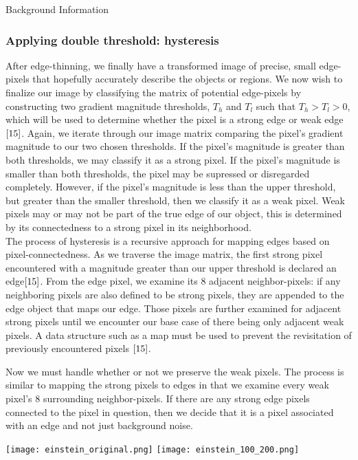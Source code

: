\documentclass[a4paper,12pt]{article}
\begin{document}
\begin{section}{Background Information}
\subsubsection{Applying double threshold: hysteresis}

After edge-thinning, we finally have a transformed image of precise, small edge-pixels that hopefully accurately describe the objects or regions.
We now wish to finalize our image by classifying the matrix of potential edge-pixels by constructing two gradient magnitude thresholds, $T_h$ and $T_l$ such that $T_h$$>$$T_l$$>$$0$, which will be used to determine whether the pixel is a strong edge or weak edge$\cite{15}$.%
Again, we iterate through our image matrix comparing the pixel's gradient magnitude to our two chosen thresholds.
If the pixel's magnitude is greater than both thresholds, we may classify it as a strong pixel.
If the pixel's magnitude is smaller than both thresholds, the pixel may be supressed or disregarded completely.
However, if the pixel's magnitude is less than the upper threshold, but greater than the smaller threshold, then we classify it as a weak pixel.
Weak pixels may or may not be part of the true edge of our object, this is determined by its connectedness to a strong pixel in its neighborhood.\\

The process of hysteresis is a recursive approach for mapping edges based on pixel-connectedness. As we traverse the image matrix, the first strong pixel encountered with a magnitude greater than our upper threshold is declared an edge$\cite{15}$.%
From the edge pixel, we examine its 8 adjacent neighbor-pixels: if any neighboring pixels are also defined to be strong pixels, they are appended to the edge object that maps our edge.
Those pixels are further examined for adjacent strong pixels until we encounter our base case of there being only adjacent weak pixels.
A data structure such as a map must be used to prevent the revisitation of previously encountered pixels $\cite{15}$.

Now we must handle whether or not we preserve the weak pixels.
The process is similar to mapping the strong pixels to edges in that we examine every weak pixel's 8 surrounding neighbor-pixels. 
If there are any strong edge pixels connected to the pixel in question, then we decide that it is a pixel associated with an edge and not just background noise.\\

\begin{center}
\texttt{[image: einstein\_original.png]}
\texttt{[image: einstein\_100\_200.png]}


\end{center}
\end{section}
\end{document}
